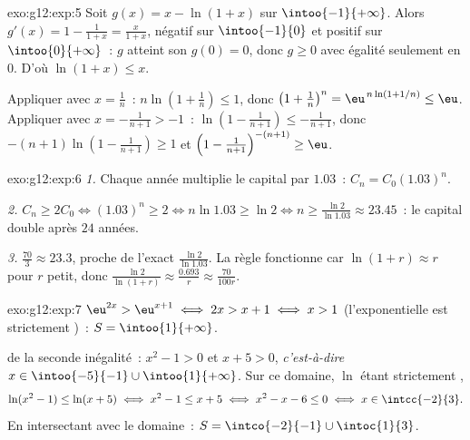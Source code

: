 \begin{solution}{exo:g12:exp:5}
Soit $g(x) = x - \ln(1+x)$ sur $\intoo{-1}{+\infty}$. Alors
$g'(x) = 1 - \frac{1}{1+x} = \frac{x}{1+x}$, négatif sur $\intoo{-1}{0}$
et positif sur $\intoo{0}{+\infty}$~: $g$ atteint son  $g(0) = 0$,
donc $g \geq 0$ avec égalité seulement en $0$. D'où $\ln(1+x) \leq x$.

Appliquer avec $x = \frac1n$~:
$n\ln\left(1 + \frac1n\right) \leq 1$, donc
$\left(1+\frac1n\right)^n = \eu^{\,n\ln(1+1/n)} \leq \eu$.
Appliquer avec $x = -\frac{1}{n+1} > -1$~:
$\ln\left(1 - \frac{1}{n+1}\right) \leq -\frac{1}{n+1}$, donc
$-(n+1)\ln\left(1 - \frac{1}{n+1}\right) \geq 1$ et
$\left(1 - \frac{1}{n+1}\right)^{-(n+1)} \geq \eu$.
\end{solution}

\begin{solution}{exo:g12:exp:6}
\emph{1.} Chaque année multiplie le capital par $1.03$~:
$C_n = C_0 (1.03)^n$.

\emph{2.} $C_n \geq 2C_0 \iff (1.03)^n \geq 2 \iff n \ln 1.03 \geq \ln 2
\iff n \geq \frac{\ln 2}{\ln 1.03} \approx 23.45$~: le capital double
après $24$ années.

\emph{3.} $\frac{70}{3} \approx 23.3$, proche de l'exact
$\frac{\ln 2}{\ln 1.03}$. La règle fonctionne car
$\ln(1 + r) \approx r$ pour $r$ petit, donc
$\frac{\ln 2}{\ln(1+r)} \approx \frac{0.693}{r} \approx \frac{70}{100r}$.
\end{solution}

\begin{solution}{exo:g12:exp:7}
$\eu^{2x} > \eu^{x+1} \iff 2x > x + 1 \iff x > 1$ (l'exponentielle est
strictement )~: $S = \intoo{1}{+\infty}$.

 de la seconde inégalité~: $x^2 - 1 > 0$ et
$x + 5 > 0$, \emph{c'est-à-dire}
$x \in \intoo{-5}{-1} \cup \intoo{1}{+\infty}$. Sur ce domaine, $\ln$
étant strictement ,
\[
\ln(x^2-1) \leq \ln(x+5) \iff x^2 - 1 \leq x + 5 \iff x^2 - x - 6 \leq 0
\iff x \in \intcc{-2}{3}.
\]
En intersectant avec le domaine~: $S = \intco{-2}{-1} \cup \intoc{1}{3}$.
\end{solution}

